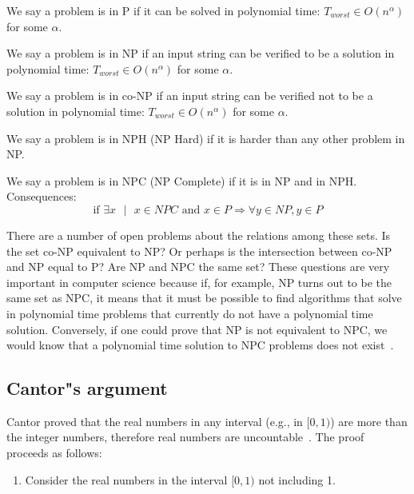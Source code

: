 \documentclass[justified, sixbynine]{tufte-book}
\theoremstyle{plain}%
\newtheorem * {corollary}{Corollary}
\theoremstyle{definition}
\theoremstyle{remark}
\newtheorem * {remark}{Remark}
\newtheorem * {note}{Note}
\begin{document}
\begin{fullwidth}
We say a problem is in P if it can be solved in polynomial time: $%
T_{worst}\in O(n^\alpha )$ for some $\alpha $.

We say a problem is in NP if an input string can be verified to be a
solution in polynomial time: $T_{worst}\in O(n^\alpha )$ for some $\alpha $.

We say a problem is in co-NP if an input string can be verified not to be a
solution in polynomial time: $T_{worst}\in O(n^\alpha )$ for some $\alpha $.

We say a problem is in NPH (NP Hard) if it is harder than any other problem
in NP.

We say a problem is in NPC (NP Complete) if it is in NP and in NPH.
Consequences:
\begin{equation}
\text{if }\exists x\text{ }|\text{ }x\in NPC\text{ and }x\in P\Rightarrow
\forall y\in NP, y\in P
\end{equation}

There are a number of open problems about the relations among these sets.
Is the set co-NP equivalent to NP? Or perhaps is the intersection between co-NP and NP equal to P?
Are NP and NPC the same set? These questions are very important in computer science because if, for example, NP turns out to be the same set as NPC, it means that it must be possible to find algorithms that solve in polynomial time problems that currently do not have a polynomial time solution. Conversely, if one could prove that NP is not equivalent to NPC, we would know that a polynomial time solution to NPC problems does not exist~\cite{pnp}.

\subsection{Cantor"s argument}


Cantor proved that the real numbers in any interval (e.g., in $[0, 1)$)
are more than the integer numbers, therefore real numbers are uncountable~\cite{hofstadter}.
The proof proceeds as follows:

\begin{enumerate}
\item  Consider the real numbers in the interval $[0, 1)$ not including 1$.$


\end{enumerate}
\end{fullwidth}
\end{document}
